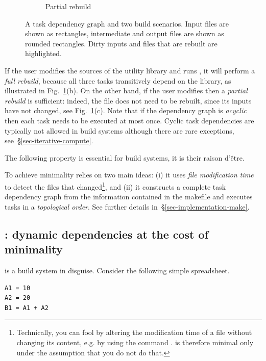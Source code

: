 \begin{figure}[h]
\begin{subfigure}[b]{0.32\linewidth}
\caption{Partial rebuild}
\end{subfigure}
\caption{A task dependency graph and two build scenarios. Input files are shown as
rectangles, intermediate and output files are shown as rounded rectangles. Dirty
inputs and files that are rebuilt are highlighted.
\label{fig-make}}
\end{figure}

If the user modifies the sources of the utility library and runs \Make, it will
perform a \emph{full rebuild}, because all three tasks transitively depend on
the library, as illustrated in Fig.~\ref{fig-make}(b). On the other hand, if the
user modifies  then a \emph{partial rebuild} is sufficient: indeed,
the file  does not need to be rebuilt, since its inputs have not
changed, see Fig.~\ref{fig-make}(c). Note that if the dependency graph is
\emph{acyclic} then each task needs to be executed at most once. Cyclic task
dependencies are typically not allowed in build systems although there are rare
exceptions, see~\S\ref{sec-iterative-compute}.

The following property is essential for build systems, it is their raison d'\^etre.

\vspace{2mm}

To achieve minimality \Make relies on two main ideas: (i) it uses \emph{file
modification time} to detect the files that changed\footnote{Technically, you
can fool \Make by altering the modification time of a file without changing its
content, e.g. by using the command . \Make is therefore minimal only
under the assumption that you do not do that.}, and (ii) it constructs a
complete task dependency graph from the information contained in the makefile
and executes tasks in a \emph{topological order}. See further details
in~\S\ref{sec-implementation-make}.

\subsection{\Excel: dynamic dependencies at the cost of minimality}
\label{sec-background-excel}

\Excel is a build system in disguise. Consider the following simple spreadsheet.

\vspace{1mm}
\begin{verbatim}
A1 = 10
A2 = 20
B1 = A1 + A2
\end{verbatim}
\vspace{1mm}

